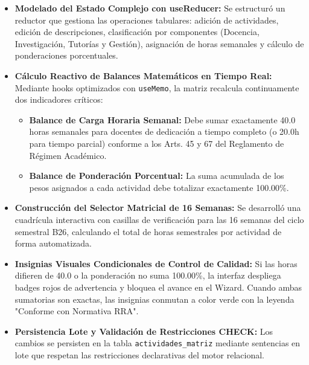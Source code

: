 \documentclass[12pt,a4paper]{article}
\begin{document}
\begin{itemize}[leftmargin=1.5em, itemsep=4pt]
    \item \textbf{Modelado del Estado Complejo con useReducer:} Se estructuró un reductor que gestiona las operaciones tabulares: adición de actividades, edición de descripciones, clasificación por componentes (Docencia, Investigación, Tutorías y Gestión), asignación de horas semanales y cálculo de ponderaciones porcentuales.
    \item \textbf{Cálculo Reactivo de Balances Matemáticos en Tiempo Real:} Mediante hooks optimizados con \texttt{useMemo}, la matriz recalcula continuamente dos indicadores críticos:
    \begin{itemize}[leftmargin=1.2em, itemsep=2pt]
        \item \textbf{Balance de Carga Horaria Semanal:} Debe sumar exactamente 40.0 horas semanales para docentes de dedicación a tiempo completo (o 20.0h para tiempo parcial) conforme a los Arts. 45 y 67 del Reglamento de Régimen Académico.
        \item \textbf{Balance de Ponderación Porcentual:} La suma acumulada de los pesos asignados a cada actividad debe totalizar exactamente 100.00\%.
    \end{itemize}
    \item \textbf{Construcción del Selector Matricial de 16 Semanas:} Se desarrolló una cuadrícula interactiva con casillas de verificación para las 16 semanas del ciclo semestral B26, calculando el total de horas semestrales por actividad de forma automatizada.
    \item \textbf{Insignias Visuales Condicionales de Control de Calidad:} Si las horas difieren de 40.0 o la ponderación no suma 100.00\%, la interfaz despliega badges rojos de advertencia y bloquea el avance en el Wizard. Cuando ambas sumatorias son exactas, las insignias conmutan a color verde con la leyenda "Conforme con Normativa RRA".
    \item \textbf{Persistencia Lote y Validación de Restricciones CHECK:} Los cambios se persisten en la tabla \texttt{actividades\_\allowbreak  matriz} mediante sentencias en lote que respetan las restricciones declarativas del motor relacional.
\end{itemize}
\end{document}
